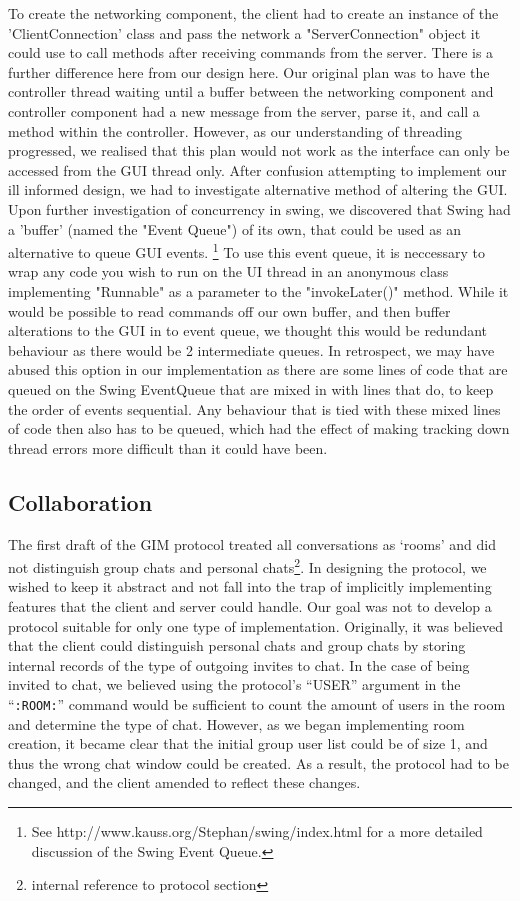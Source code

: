  To create the networking component, the client had to create an instance of the 'ClientConnection' class and pass the network a "ServerConnection" object it could use to call methods after receiving commands from the server. There is a further difference here from our design here. Our original plan was to have the controller thread waiting until a buffer between the networking component and controller component had a new message from the server, parse it, and call a method within the controller. However, as our understanding of threading progressed, we realised that this plan would not work as the interface can only be accessed from the GUI thread only. After confusion attempting to implement our ill informed design, we had to investigate alternative method of altering the GUI. Upon further investigation of concurrency in swing, we discovered that Swing had a 'buffer' (named the "Event Queue") of its own, that could be used as an alternative to queue GUI events. \footnote{See http://www.kauss.org/Stephan/swing/index.html for a more detailed discussion of the Swing Event Queue.} To use this event queue, it is neccessary to wrap any code you wish to run on the UI thread in an anonymous class implementing "Runnable" as a parameter to the "invokeLater()" method.  While it would be possible to read commands off our own buffer, and then buffer alterations to the GUI in to event queue, we thought this would be redundant behaviour as there would be 2 intermediate queues. In retrospect, we may have abused this option in our implementation as there are some lines of code that are queued on the Swing EventQueue that are mixed in with lines that do, to keep the order of events sequential. Any behaviour that is tied with these mixed lines of code then also has to be queued, which had the effect of making tracking down thread errors more difficult than it could have been. 


\subsection{Collaboration}

The first draft of the GIM protocol treated all conversations as `rooms' and did not distinguish group chats and personal chats\footnote{internal reference to protocol section}. In designing the protocol, we wished to keep it abstract and not fall into the trap of implicitly implementing features that the client and server could handle. Our goal was not to develop a protocol suitable for only one type of implementation. Originally, it was believed that the client could distinguish personal chats and group chats by storing internal records of the type of outgoing invites to chat. In the case of being invited to chat, we believed using the protocol's ``USER'' argument in the ``\texttt{:ROOM:}'' command would be sufficient to count the amount of users in the room and determine the type of chat. However, as we began implementing room creation, it became clear that the initial group user list could be of size 1, and thus the wrong chat window could be created. As a result, the protocol had to be changed, and the client amended to reflect these changes. 

